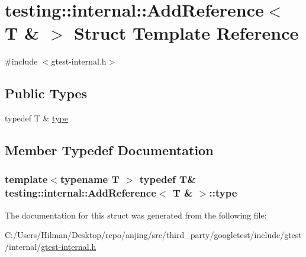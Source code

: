 \hypertarget{structtesting_1_1internal_1_1_add_reference_3_01_t_01_6_01_4}{}\section{testing\+:\+:internal\+:\+:Add\+Reference$<$ T \& $>$ Struct Template Reference}
\label{structtesting_1_1internal_1_1_add_reference_3_01_t_01_6_01_4}


{\ttfamily \#include $<$gtest-\/internal.\+h$>$}

\subsection*{Public Types}
\begin{DoxyCompactItemize}
\item 
typedef T \& \hyperlink{structtesting_1_1internal_1_1_add_reference_3_01_t_01_6_01_4_a93c064cdcdaced0abd167258425e57af}{type}
\end{DoxyCompactItemize}


\subsection{Member Typedef Documentation}
\hypertarget{structtesting_1_1internal_1_1_add_reference_3_01_t_01_6_01_4_a93c064cdcdaced0abd167258425e57af}{}
\subsubsection[{type}]{\setlength{\rightskip}{0pt plus 5cm}template$<$typename T $>$ typedef T\& {\bf testing\+::internal\+::\+Add\+Reference}$<$ T \& $>$\+::{\bf type}}\label{structtesting_1_1internal_1_1_add_reference_3_01_t_01_6_01_4_a93c064cdcdaced0abd167258425e57af}


The documentation for this struct was generated from the following file\+:\begin{DoxyCompactItemize}
\item 
C\+:/\+Users/\+Hilman/\+Desktop/repo/anjing/src/third\+\_\+party/googletest/include/gtest/internal/\hyperlink{gtest-internal_8h}{gtest-\/internal.\+h}\end{DoxyCompactItemize}
